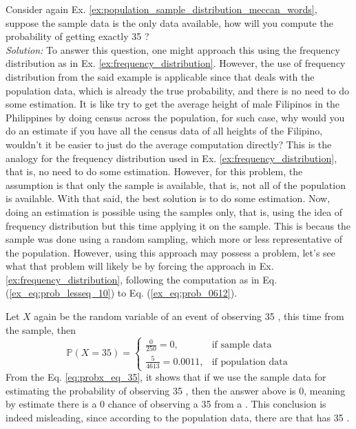 \begin{exmpx}
Consider again Ex. \ref{ex:population_sample_distribution_meccan_words}, suppose the sample data is the only data available, how will you compute the probability of getting exactly 35  ?\\
\textit{Solution:} To answer this question, one might approach this using the frequency distribution as in Ex. \ref{ex:frequency_distribution}. However, the use of frequency distribution from the said example is applicable since that deals with the population data, which is already the true probability, and there is no need to do some estimation. It is like try to get the average height of male Filipinos in the Philippines by doing census across the population, for such case, why would you do an estimate if you have all the census data of all heights of the Filipino, wouldn't it be easier to just do the average computation directly? This is the analogy for the frequency distribution used in Ex. \ref{ex:frequency_distribution}, that is, no need to do some estimation. However, for this problem, the assumption is that only the sample is available, that is, not all of the population is available. With that said, the best solution is to do some estimation. Now, doing an estimation is possible using the samples only, that is, using the idea of frequency distribution but this time applying it on the sample. This is becaus the sample was done using a random sampling, which more or less representative of the population. However, using this approach may possess a problem, let's see what that problem will likely be by forcing the approach in Ex. \ref{ex:frequency_distribution}, following the computation as in Eq. (\ref{ex_eq:prob_lesseq_10}) to Eq. (\ref{ex_eq:prob_0612}). 

Let $X$ again be the random variable of an event of observing 35  , this time from the sample, then
\begin{equation}\label{eq:probx_eq_35}
    \mathbb{P}(X=35)=\begin{cases}
        \displaystyle\frac{0}{250}=0,&\text{if sample data}\\
        \displaystyle\frac{5}{4613}=0.0011,&\text{if population data}
    \end{cases}
\end{equation}
From the Eq. \ref{eq:probx_eq_35}, it shows that if we use the sample data for estimating the probability of observing 35 , then the answer above is 0, meaning by estimate there is a 0 chance of observing a 35  from a  . This conclusion is indeed misleading, since according to the population data, there are   that has 35  . 


\end{exmpx}

